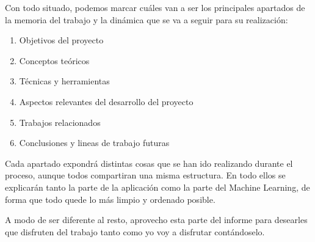 Con todo situado, podemos marcar cuáles van a ser los principales apartados de la memoria del trabajo y la dinámica que se va a seguir para su realización:

\begin{enumerate}
	\item Objetivos del proyecto
	\item Conceptos teóricos
	\item Técnicas y herramientas
	\item Aspectos relevantes del desarrollo del proyecto
	\item Trabajos relacionados
	\item Conclusiones y lineas de trabajo futuras
\end{enumerate}

Cada apartado expondrá distintas cosas que se han ido realizando durante el proceso, aunque todos compartiran una misma estructura. En todo ellos se explicarán tanto la parte de la aplicación como la parte del Machine Learning, de forma que todo quede lo más limpio y ordenado posible.

A modo de ser diferente al resto, aprovecho esta parte del informe para desearles que disfruten del trabajo tanto como yo voy a disfrutar contándoselo.
